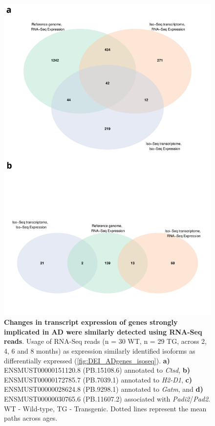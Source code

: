 \begin{figure}[!htp]
	\centering
	\includegraphics[page=19,scale = 0.55]{Figures/WholeDifferentialAnalysis.pdf}
	\captionsetup{width=0.95\textwidth}
	\caption[Changes in transcript expression of genes strongly implicated in AD were similarly detected using RNA-Seq reads]%
	{\textbf{Changes in transcript expression of genes strongly implicated in AD were similarly detected using RNA-Seq reads}. Usage of RNA-Seq reads (n = 30 WT, n = 29 TG, across 2, 4, 6 and 8 months) as expression similarly identified isoforms as differentially expressed (\cref{fig:DEI_ADgenes_isoseq}). \textbf{a)} ENSMUST00000151120.8 (PB.15108.6) annotated to \textit{Ctsd}, \textbf{b)} ENSMUST00000172785.7 (PB.7039.1) annotated to \textit{H2-D1}, \textbf{c)} ENSMUST00000028624.8 (PB.9298.1) annotated to \textit{Gatm}, and \textbf{d)} ENSMUST00000030765.6 (PB.11607.2) associated with \textit{Padi2}/\textit{Pad2}.  WT - Wild-type, TG - Transgenic. Dotted lines represent the mean paths across ages.}   
	\label{fig:DEI_ADgenes_rnaseq}
\end{figure}

